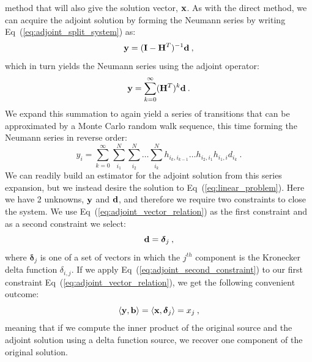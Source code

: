 method that will also give the solution vector, $\mathbf{x}$. As with the
direct method, we can acquire the adjoint solution by forming the
Neumann series by writing Eq~(\ref{eq:adjoint_split_system}) as:
\begin{equation}
  \mathbf{y} = (\mathbf{I} - \mathbf{H}^T)^{-1} \mathbf{d}\:,
  \label{eq:adjoint_split_system_2}
\end{equation}
which in turn yields the Neumann series using the adjoint operator:
\begin{equation}
  \mathbf{y} = \sum_{k=0}^{\infty} (\mathbf{H}^T)^k\mathbf{d}\:.
  \label{eq:adjoint_neumann_series}
\end{equation}
We expand this summation to again yield a series of transitions that
can be approximated by a Monte Carlo random walk sequence, this time
forming the Neumann series in reverse order:
\begin{equation}
  y_i = \sum_{k=0}^{\infty}\sum_{i_1}^{N}\sum_{i_2}^{N}\ldots
  \sum_{i_k}^{N}h_{i_k,i_{k-1}}\ldots h_{i_2,i_1} h_{i_1,i} d_{i_k}\:.
  \label{eq:adjoint_neumann_solution}
\end{equation}
We can readily build an estimator for the adjoint solution from this
series expansion, but we instead desire the solution to
Eq~(\ref{eq:linear_problem}). Here we have 2 unknowns, $\mathbf{y}$ and
$\mathbf{d}$, and therefore we require two constraints to close the
system. We use Eq~(\ref{eq:adjoint_vector_relation}) as the first
constraint and as a second constraint we select:
\begin{equation}
  \mathbf{d} = \boldsymbol{\delta}_j\:,
  \label{eq:adjoint_second_constraint}
\end{equation}
where $\boldsymbol{\delta}_j$ is one of a set of vectors in which the
$j^{th}$ component is the Kronecker delta function $\delta_{i,j}$. If
we apply Eq~(\ref{eq:adjoint_second_constraint}) to our first
constraint Eq~(\ref{eq:adjoint_vector_relation}), we get the following
convenient outcome:
\begin{equation}
  \langle \mathbf{y}, \mathbf{b} \rangle = \langle \mathbf{x},
  \boldsymbol{\delta}_j \rangle = x_j \:,
  \label{eq:inner_product_constraint}
\end{equation}
meaning that if we compute the inner product of the original source
and the adjoint solution using a delta function source, we recover one
component of the original solution.

